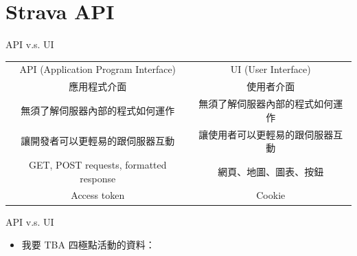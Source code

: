 \section{Strava API}

\begin{frame}{API v.s. UI}
\begin{center}
\begin{tabular}{c|c}
API (Application Program Interface) & UI (User Interface)\\
應用程式介面 & 使用者介面\\\hline\pause
無須了解伺服器內部的程式如何運作 & 無須了解伺服器內部的程式如何運作\\\pause
讓開發者可以更輕易的跟伺服器互動 & 讓使用者可以更輕易的跟伺服器互動\\\pause
GET, POST requests, formatted response & 網頁、地圖、圖表、按鈕\\\pause
Access token & Cookie
\end{tabular}
\end{center}
\end{frame}

\begin{frame}{API v.s. UI}
\begin{itemize}
\item 我要 TBA 四極點活動的資料：\pause
{}
\end{itemize}
\end{frame}

